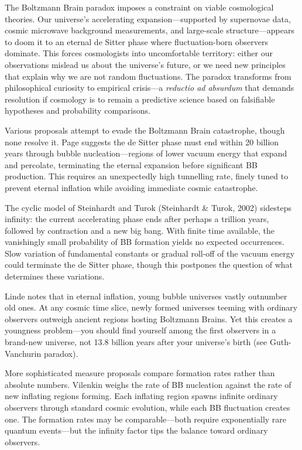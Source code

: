 The Boltzmann Brain paradox imposes a constraint on viable cosmological theories. Our universe's accelerating expansion—supported by supernovae data, cosmic microwave background measurements, and large-scale structure—appears to doom it to an eternal de Sitter phase where fluctuation-born observers dominate. This forces cosmologists into uncomfortable territory: either our observations mislead us about the universe's future, or we need new principles that explain why we are not random fluctuations. The paradox transforms from philosophical curiosity to empirical crisis—a \textit{reductio ad absurdum} that demands resolution if cosmology is to remain a predictive science based on falsifiable hypotheses and probability comparisons.

Various proposals attempt to evade the Boltzmann Brain catastrophe, though none resolve it. Page suggests the de Sitter phase must end within 20 billion years through bubble nucleation—regions of lower vacuum energy that expand and percolate, terminating the eternal expansion before significant BB production. This requires an unexpectedly high tunnelling rate, finely tuned to prevent eternal inflation while avoiding immediate cosmic catastrophe.

The cyclic model of Steinhardt and Turok (Steinhardt \& Turok, 2002) sidesteps infinity: the current accelerating phase ends after perhaps a trillion years, followed by contraction and a new big bang. With finite time available, the vanishingly small probability of BB formation yields no expected occurrences. Slow variation of fundamental constants or gradual roll-off of the vacuum energy could terminate the de Sitter phase, though this postpones the question of what determines these variations.

Linde notes that in eternal inflation, young bubble universes vastly outnumber old ones. At any cosmic time slice, newly formed universes teeming with ordinary observers outweigh ancient regions hosting Boltzmann Brains. Yet this creates a \QSOpen{}youngness problem\QSClose{}—you should find yourself among the first observers in a brand-new universe, not 13.8 billion years after your universe's birth (see Guth-Vanchurin paradox).

More sophisticated measure proposals compare formation rates rather than absolute numbers. Vilenkin weighs the rate of BB nucleation against the rate of new inflating regions forming. Each inflating region spawns infinite ordinary observers through standard cosmic evolution, while each BB fluctuation creates one. The formation rates may be comparable—both require exponentially rare quantum events—but the \QSOpen{}infinity\QSClose{} factor tips the balance toward ordinary observers.

